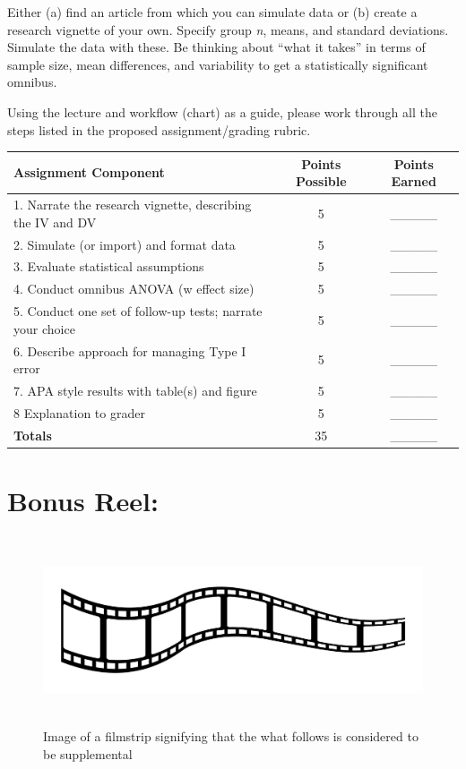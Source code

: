 \documentclass[
  english,
]{book}
\begin{document}
Either (a) find an article from which you can simulate data or (b) create a research vignette of your own. Specify group \emph{n}, means, and standard deviations. Simulate the data with these. Be thinking about ``what it takes'' in terms of sample size, mean differences, and variability to get a statistically significant omnibus.

Using the lecture and workflow (chart) as a guide, please work through all the steps listed in the proposed assignment/grading rubric.

\begin{longtable}[]{@{}lcc@{}}
\toprule
Assignment Component & Points Possible & Points Earned\tabularnewline
\midrule
\endhead
1. Narrate the research vignette, describing the IV and DV & 5 & \_\_\_\_\_\tabularnewline
2. Simulate (or import) and format data & 5 & \_\_\_\_\_\tabularnewline
3. Evaluate statistical assumptions & 5 & \_\_\_\_\_\tabularnewline
4. Conduct omnibus ANOVA (w effect size) & 5 & \_\_\_\_\_\tabularnewline
5. Conduct one set of follow-up tests; narrate your choice & 5 & \_\_\_\_\_\tabularnewline
6. Describe approach for managing Type I error & 5 & \_\_\_\_\_\tabularnewline
7. APA style results with table(s) and figure & 5 & \_\_\_\_\_\tabularnewline
8 Explanation to grader & 5 & \_\_\_\_\_\tabularnewline
\textbf{Totals} & 35 & \_\_\_\_\_\tabularnewline
\bottomrule
\end{longtable}

\hypertarget{bonus-reel}{%
\section{Bonus Reel:}\label{bonus-reel}}

\begin{figure}
\hypertarget{id}{%
\centering
\includegraphics[width=6.45833in,height=2.19792in]{images/film-strip-1.jpg}
\caption{Image of a filmstrip signifying that the what follows is considered to be supplemental}\label{id}
}
\end{figure}
\end{document}
